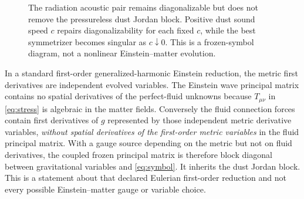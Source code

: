 \documentclass[11pt,a4paper]{article}
\begin{document}
\begin{figure}[t]
\centering
{}
\caption{The radiation acoustic pair remains diagonalizable
but does not remove the pressureless dust Jordan block.
Positive dust sound speed $c$ repairs diagonalizability
for each fixed $c$, while the best symmetrizer becomes
singular as $c\downarrow0$. This is a frozen-symbol
diagram, not a nonlinear Einstein--matter evolution.}
\label{fig:jordan}
\end{figure}

In a standard first-order generalized-harmonic
Einstein reduction, the metric first derivatives
are independent evolved variables.
The Einstein wave principal matrix contains no
spatial derivatives of the perfect-fluid unknowns
because $T_{\mu\nu}$ in \eqref{eq:stress}
is algebraic in the matter fields. Conversely
the fluid connection forces contain first
derivatives of $g$ represented by those independent
metric derivative variables, \emph{without spatial
derivatives of the first-order metric variables}
in the fluid principal matrix. With a gauge source
depending on the metric but not on fluid derivatives,
the coupled frozen principal matrix is therefore
block diagonal between gravitational variables
and \eqref{eq:symbol}. It inherits the dust Jordan
block. This is a statement about that declared
Eulerian first-order reduction and not every
possible Einstein--matter gauge or variable
choice.
\end{document}
